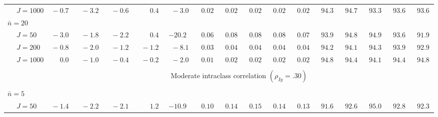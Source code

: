 \begin{sidewaystable}
\begin{threeparttable}
\begin{tabular}{llccccccccccccccc}
 & \nopagebreak $\;J=1000$  & $\phantom{0}{-}0.7\phantom{0}$ & $\phantom{0}{-}3.2\phantom{0}$ & $\phantom{0}{-}0.6\phantom{0}$ & $\phantom{0}\phantom{-}0.4\phantom{0}$ & $\phantom{0}{-}3.0\phantom{0}$ & $\phantom{0}0.02\phantom{0}$ & $\phantom{0}0.02\phantom{0}$ & $\phantom{0}0.02\phantom{0}$ & $\phantom{0}0.02\phantom{0}$ & $\phantom{0}0.02\phantom{0}$ & $\phantom{0}94.3\phantom{0}$ & $\phantom{0}94.7\phantom{0}$ & $\phantom{0}93.3\phantom{0}$ & $\phantom{0}93.6\phantom{0}$ & $\phantom{0}93.6\phantom{0}$ \\
\multicolumn{4}{l}{$\bar{n}=20$} \\  & \nopagebreak $\;J=50$  & $\phantom{0}{-}3.0\phantom{0}$ & $\phantom{0}{-}1.8\phantom{0}$ & $\phantom{0}{-}2.2\phantom{0}$ & $\phantom{0}\phantom{-}0.4\phantom{0}$ & ${-}20.2\phantom{0}$ & $\phantom{0}0.06\phantom{0}$ & $\phantom{0}0.08\phantom{0}$ & $\phantom{0}0.08\phantom{0}$ & $\phantom{0}0.08\phantom{0}$ & $\phantom{0}0.07\phantom{0}$ & $\phantom{0}93.9\phantom{0}$ & $\phantom{0}94.8\phantom{0}$ & $\phantom{0}94.9\phantom{0}$ & $\phantom{0}93.6\phantom{0}$ & $\phantom{0}91.9\phantom{0}$ \\
 & \nopagebreak $\;J=200$  & $\phantom{0}{-}0.8\phantom{0}$ & $\phantom{0}{-}2.0\phantom{0}$ & $\phantom{0}{-}1.2\phantom{0}$ & $\phantom{0}{-}1.2\phantom{0}$ & $\phantom{0}{-}8.1\phantom{0}$ & $\phantom{0}0.03\phantom{0}$ & $\phantom{0}0.04\phantom{0}$ & $\phantom{0}0.04\phantom{0}$ & $\phantom{0}0.04\phantom{0}$ & $\phantom{0}0.04\phantom{0}$ & $\phantom{0}94.2\phantom{0}$ & $\phantom{0}94.1\phantom{0}$ & $\phantom{0}94.3\phantom{0}$ & $\phantom{0}93.9\phantom{0}$ & $\phantom{0}92.9\phantom{0}$ \\
 & \nopagebreak $\;J=1000$  & $\phantom{0}\phantom{-}0.0\phantom{0}$ & $\phantom{0}{-}1.0\phantom{0}$ & $\phantom{0}{-}0.4\phantom{0}$ & $\phantom{0}{-}0.2\phantom{0}$ & $\phantom{0}{-}2.0\phantom{0}$ & $\phantom{0}0.01\phantom{0}$ & $\phantom{0}0.02\phantom{0}$ & $\phantom{0}0.02\phantom{0}$ & $\phantom{0}0.02\phantom{0}$ & $\phantom{0}0.02\phantom{0}$ & $\phantom{0}94.8\phantom{0}$ & $\phantom{0}94.4\phantom{0}$ & $\phantom{0}94.1\phantom{0}$ & $\phantom{0}94.4\phantom{0}$ & $\phantom{0}94.8\phantom{0}$ \\
[0.5ex]\hline\\[-1.6ex] 
& & \multicolumn{15}{c}{Moderate intraclass correlation $(\rho_{Iy}=.30)$} \\[0.6ex]\hline\\[-1.8ex]
\multicolumn{4}{l}{$\bar{n}=5$} \\  & \nopagebreak $\;J=50$  & $\phantom{0}{-}1.4\phantom{0}$ & $\phantom{0}{-}2.2\phantom{0}$ & $\phantom{0}{-}2.1\phantom{0}$ & $\phantom{0}\phantom{-}1.2\phantom{0}$ & ${-}10.9\phantom{0}$ & $\phantom{0}0.10\phantom{0}$ & $\phantom{0}0.14\phantom{0}$ & $\phantom{0}0.15\phantom{0}$ & $\phantom{0}0.14\phantom{0}$ & $\phantom{0}0.13\phantom{0}$ & $\phantom{0}91.6\phantom{0}$ & $\phantom{0}92.6\phantom{0}$ & $\phantom{0}95.0\phantom{0}$ & $\phantom{0}92.8\phantom{0}$ & $\phantom{0}92.3\phantom{0}$ \\

\end{tabular}
\end{threeparttable}
\end{sidewaystable}
